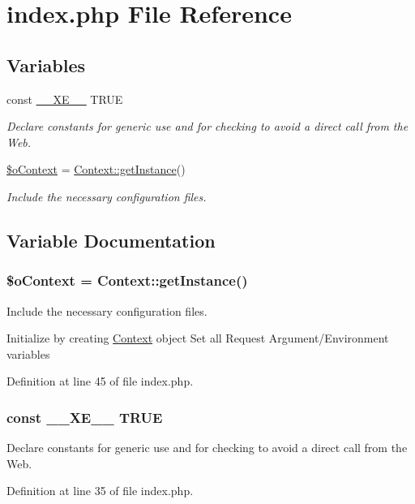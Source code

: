\hypertarget{index_8php}{\section{index.\-php File Reference}
\label{index_8php}
}
\subsection*{Variables}
\begin{DoxyCompactItemize}
\item 
const \hyperlink{index_8php_a697de427d83b791899ae45d555377756}{\-\_\-\-\_\-\-X\-E\-\_\-\-\_\-} T\-R\-U\-E
\begin{DoxyCompactList}\small\item\em Declare constants for generic use and for checking to avoid a direct call from the Web. \end{DoxyCompactList}\item 
\hyperlink{index_8php_aacfc569bef069a536ba65859b245068b}{\$o\-Context} = \hyperlink{classContext_a399e419617c7fe9b0c9eaf22c431df69}{Context\-::get\-Instance}()
\begin{DoxyCompactList}\small\item\em Include the necessary configuration files. \end{DoxyCompactList}\end{DoxyCompactItemize}


\subsection{Variable Documentation}
\hypertarget{index_8php_aacfc569bef069a536ba65859b245068b}{
\subsubsection[{\$o\-Context}]{\setlength{\rightskip}{0pt plus 5cm}\$o\-Context = {\bf Context\-::get\-Instance}()}}\label{index_8php_aacfc569bef069a536ba65859b245068b}


Include the necessary configuration files. 

Initialize by creating \hyperlink{classContext}{Context} object Set all Request Argument/\-Environment variables 

Definition at line 45 of file index.\-php.

\hypertarget{index_8php_a697de427d83b791899ae45d555377756}{
\subsubsection[{\-\_\-\-\_\-\-X\-E\-\_\-\-\_\-}]{\setlength{\rightskip}{0pt plus 5cm}const \-\_\-\-\_\-\-X\-E\-\_\-\-\_\- T\-R\-U\-E}}\label{index_8php_a697de427d83b791899ae45d555377756}


Declare constants for generic use and for checking to avoid a direct call from the Web. 



Definition at line 35 of file index.\-php.

